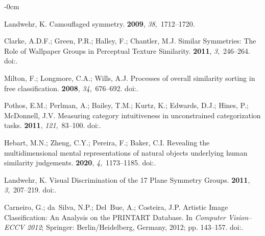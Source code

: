 \documentclass[symmetry,article,accept,pdftex,moreauthors]{Definitions/mdpi}
\begin{document}
\begin{adjustwidth}{-\extralength}{0cm}
\begin{thebibliography}{999}
Landwehr, K.
\newblock Camouflaged symmetry.
 {\bf 2009}, {\em 38},~1712--1720.

Clarke, A.D.F.; Green, P.R.; Halley, F.; Chantler, M.J.
\newblock Similar Symmetries: The Role of Wallpaper Groups in Perceptual
  Texture Similarity.
 {\bf 2011}, {\em 3},~246--264.
\newblock
  doi:{\href{https://doi.org/10.3390/sym3020246}{}}.

Milton, F.; Longmore, C.A.; Wills, A.J.
\newblock Processes of overall similarity sorting in free classification.
 {\bf 2008}, {\em 34},~676--692.
\newblock
  doi:{\href{https://doi.org/10.1037/0096-1523.34.3.676}{}}.

Pothos, E.M.; Perlman, A.; Bailey, T.M.; Kurtz, K.; Edwards, D.J.; Hines, P.;
  McDonnell, J.V.
\newblock Measuring category intuitiveness in unconstrained categorization
  tasks.
 {\bf 2011}, {\em 121},~83--100.
\newblock
  doi:{\href{https://doi.org/10.1016/j.cognition.2011.06.002}{}}.

Hebart, M.N.; Zheng, C.Y.; Pereira, F.; Baker, C.I.
\newblock Revealing the multidimensional mental representations of natural
  objects underlying human similarity judgements.
 {\bf 2020}, {\em 4},~1173--1185.
\newblock
  doi:{\href{https://doi.org/10.1038/s41562-020-00951-3}{}}.

Landwehr, K.
\newblock Visual Discrimination of the 17 Plane Symmetry Groups.
 {\bf 2011}, {\em 3},~207--219.
\newblock
  doi:{\href{https://doi.org/10.3390/sym3020207}{}}.

Carneiro, G.; da~Silva, N.P.; Del~Bue, A.; Costeira, J.P.
\newblock Artistic Image Classification: An Analysis on the {PRINTART}
  Database.
\newblock  In \emph{Computer Vision--{ECCV} 2012}; Springer: Berlin/Heidelberg,  Germany, 2012;  pp. 143--157.
\newblock
  doi:{\href{https://doi.org/10.1007/978-3-642-33765-9\_11}{}}.


\end{thebibliography}
\end{adjustwidth}
\end{document}
